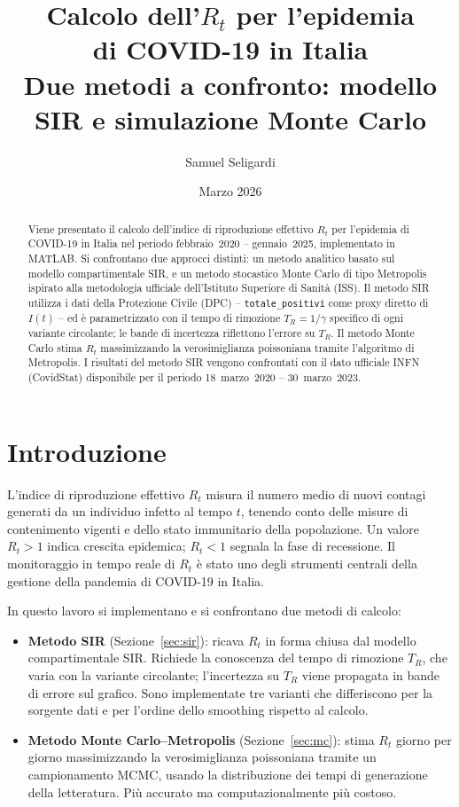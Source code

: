 \documentclass[12pt, a4paper]{article}
\title{\textbf{Calcolo dell'$R_t$ per l'epidemia\\di COVID-19 in Italia}\\[0.4em]
       \large Due metodi a confronto: modello SIR e simulazione Monte Carlo}
\author{Samuel Seligardi}
\date{Marzo 2026}
\begin{document}
\maketitle

\begin{abstract}
Viene presentato il calcolo dell'indice di riproduzione effettivo $R_t$ per l'epidemia di COVID-19
in Italia nel periodo febbraio~2020 -- gennaio~2025, implementato in MATLAB.
Si confrontano due approcci distinti: un metodo analitico basato sul modello compartimentale SIR,
e un metodo stocastico Monte Carlo di tipo Metropolis ispirato alla metodologia ufficiale
dell'Istituto Superiore di Sanità (ISS).
Il metodo SIR utilizza i dati della Protezione Civile (DPC) -- \texttt{totale\_positivi} come
proxy diretto di $I(t)$ -- ed è parametrizzato con il tempo di rimozione $T_R = 1/\gamma$
specifico di ogni variante circolante; le bande di incertezza riflettono l'errore su $T_R$.
Il metodo Monte Carlo stima $R_t$ massimizzando la verosimiglianza poissoniana tramite
l'algoritmo di Metropolis.
I risultati del metodo SIR vengono confrontati con il dato ufficiale INFN (CovidStat)
disponibile per il periodo 18~marzo~2020 -- 30~marzo~2023.
\end{abstract}

\newpage
\tableofcontents
\newpage

\section{Introduzione}

L'indice di riproduzione effettivo $R_t$ misura il numero medio di nuovi contagi generati da un
individuo infetto al tempo $t$, tenendo conto delle misure di contenimento vigenti e dello stato
immunitario della popolazione.
Un valore $R_t > 1$ indica crescita epidemica; $R_t < 1$ segnala la fase di recessione.
Il monitoraggio in tempo reale di $R_t$ è stato uno degli strumenti centrali della gestione
della pandemia di COVID-19 in Italia.

In questo lavoro si implementano e si confrontano due metodi di calcolo:

\begin{itemize}
    \item \textbf{Metodo SIR} (Sezione~\ref{sec:sir}): ricava $R_t$ in forma chiusa dal modello
          compartimentale SIR.
          Richiede la conoscenza del tempo di rimozione $T_R$, che varia con la variante circolante;
          l'incertezza su $T_R$ viene propagata in bande di errore sul grafico.
          Sono implementate tre varianti che differiscono per la sorgente dati e per l'ordine
          dello smoothing rispetto al calcolo.
    \item \textbf{Metodo Monte Carlo--Metropolis} (Sezione~\ref{sec:mc}): stima $R_t$ giorno per giorno
          massimizzando la verosimiglianza poissoniana tramite un campionamento MCMC, usando
          la distribuzione dei tempi di generazione della letteratura.
          Più accurato ma computazionalmente più costoso.
\end{itemize}
\end{document}
